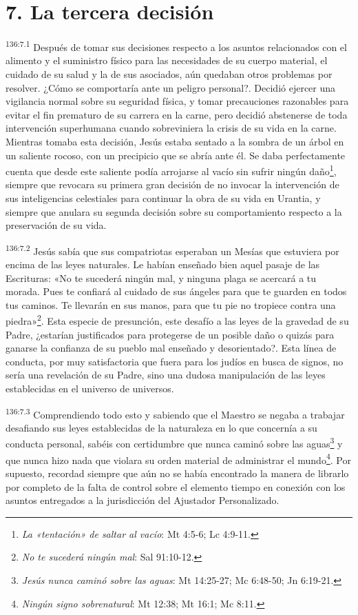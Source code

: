 \section*{7. La tercera decisión}
\par 
\textsuperscript{136:7.1} Después de tomar sus decisiones respecto a los asuntos relacionados con el alimento y el suministro físico para las necesidades de su cuerpo material, el cuidado de su salud y la de sus asociados, aún quedaban otros problemas por resolver. ¿Cómo se comportaría ante un peligro personal?. Decidió ejercer una vigilancia normal sobre su seguridad física, y tomar precauciones razonables para evitar el fin prematuro de su carrera en la carne, pero decidió abstenerse de toda intervención superhumana cuando sobreviniera la crisis de su vida en la carne. Mientras tomaba esta decisión, Jesús estaba sentado a la sombra de un árbol en un saliente rocoso, con un precipicio que se abría ante él. Se daba perfectamente cuenta que desde este saliente podía arrojarse al vacío sin sufrir ningún daño\footnote{\textit{La «tentación» de saltar al vacío}: Mt 4:5-6; Lc 4:9-11.}, siempre que revocara su primera gran decisión de no invocar la intervención de sus inteligencias celestiales para continuar la obra de su vida en Urantia, y siempre que anulara su segunda decisión sobre su comportamiento respecto a la preservación de su vida.

\par 
\textsuperscript{136:7.2} Jesús sabía que sus compatriotas esperaban un Mesías que estuviera por encima de las leyes naturales. Le habían enseñado bien aquel pasaje de las Escrituras: «No te sucederá ningún mal, y ninguna plaga se acercará a tu morada. Pues te confiará al cuidado de sus ángeles para que te guarden en todos tus caminos. Te llevarán en sus manos, para que tu pie no tropiece contra una piedra»\footnote{\textit{No te sucederá ningún mal}: Sal 91:10-12.}. Esta especie de presunción, este desafío a las leyes de la gravedad de su Padre, ¿estarían justificados para protegerse de un posible daño o quizás para ganarse la confianza de su pueblo mal enseñado y desorientado?. Esta línea de conducta, por muy satisfactoria que fuera para los judíos en busca de signos, no sería una revelación de su Padre, sino una dudosa manipulación de las leyes establecidas en el universo de universos.

\par 
\textsuperscript{136:7.3} Comprendiendo todo esto y sabiendo que el Maestro se negaba a trabajar desafiando sus leyes establecidas de la naturaleza en lo que concernía a su conducta personal, sabéis con certidumbre que nunca caminó sobre las aguas\footnote{\textit{Jesús nunca caminó sobre las aguas}: Mt 14:25-27; Mc 6:48-50; Jn 6:19-21.} y que nunca hizo nada que violara su orden material de administrar el mundo\footnote{\textit{Ningún signo sobrenatural}: Mt 12:38; Mt 16:1; Mc 8:11.}. Por supuesto, recordad siempre que aún no se había encontrado la manera de librarlo por completo de la falta de control sobre el elemento tiempo en conexión con los asuntos entregados a la jurisdicción del Ajustador Personalizado.

